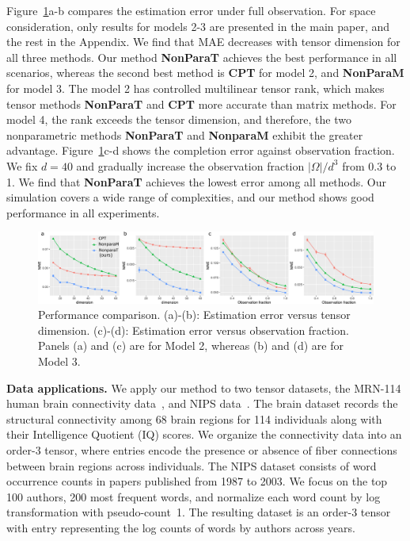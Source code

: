 \documentclass{article}
\theoremstyle{plain}
\theoremstyle{definition}
\begin{document}
Figure~\ref{fig:compare1}a-b compares the estimation error under full observation. For space consideration, only results for models 2-3 are presented in the main paper, and the rest in the Appendix. We find that MAE decreases with tensor dimension for all three methods. Our method {\bf NonParaT} achieves the best performance in all scenarios, whereas the second best method is {\bf CPT} for model 2, and {\bf NonParaM} for model 3. The model 2 has controlled multilinear tensor rank, which makes tensor methods {\bf NonParaT} and {\bf CPT} more accurate than matrix methods. For model 4, the rank exceeds the tensor dimension, and therefore, the two nonparametric methods {\bf NonParaT} and {\bf NonparaM} exhibit the greater advantage. Figure~\ref{fig:compare1}c-d shows the completion error against observation fraction. We fix $d=40$ and gradually increase the observation fraction ${|\Omega|/d^3}$ from 0.3 to 1. We find that {\bf NonParaT} achieves the lowest error among all methods. Our simulation covers a wide range of complexities, and our method shows good performance in all experiments. 

\begin{figure}[h!]
\vspace{-.1cm}
\captionsetup{font=scriptsize}
\includegraphics[width=\textwidth]{figure/fig_combined.pdf}
\vspace{-.4cm}
\caption{\scriptsize Performance comparison. (a)-(b): Estimation error versus tensor dimension. (c)-(d): Estimation error versus observation fraction. Panels (a) and (c) are for Model 2, whereas (b) and (d) are for Model 3.}\label{fig:compare1}
\vspace{-.1cm}
\end{figure}


{\bf Data applications.} We apply our method to two tensor datasets, the MRN-114 human brain connectivity data~\citep{wang2017bayesian}, and NIPS data~\cite{globerson2007euclidean}. The brain dataset records the structural connectivity among 68 brain regions for 114 individuals along with their Intelligence Quotient (IQ) scores. We organize the connectivity data into an order-3 tensor, where entries encode the presence or absence of fiber connections between brain regions across individuals. The NIPS dataset consists of word occurrence counts in papers published from 1987 to 2003. We focus on the top 100 authors, 200 most frequent words, and normalize each word count by log transformation with pseudo-count~1. The resulting dataset is an order-3 tensor with entry representing the log counts of words by authors across years. 
\end{document}
